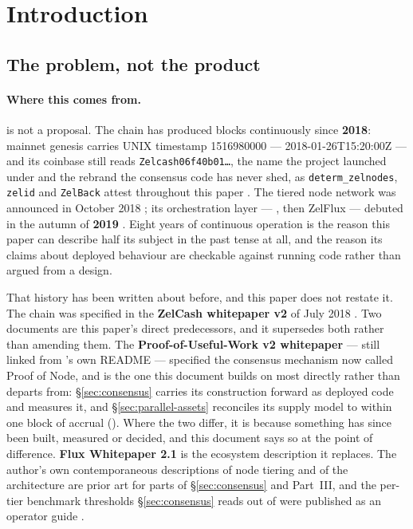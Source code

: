 \section{Introduction}
\label{sec:introduction}

\subsection{The problem, not the product}
\label{sec:intro-problem}

\paragraph{Where this comes from.} \Flux{} is not a proposal. The chain has produced blocks
continuously since \textbf{2018}: mainnet genesis carries UNIX timestamp \num{1516980000} ---
2018-01-26T15:20:00Z --- and its coinbase still reads \texttt{Zelcash06f40b01\ldots}, the name the
project launched under and the rebrand the consensus code has never shed, as \texttt{determ\_zelnodes},
\texttt{zelid} and \texttt{ZelBack} attest throughout this paper \shipped
{}. The tiered node network was
announced in October 2018 \citep{zelnodes2018}; its orchestration layer --- \FluxOS{}, then ZelFlux
--- debuted in the autumn of \textbf{2019} \citep{zelflux2019}. Eight years of continuous operation
is the reason this paper can describe half its subject in the past tense at all, and the reason its
claims about deployed behaviour are checkable against running code rather than argued from a design.

That history has been written about before, and this paper does not restate it. The chain was
specified in the \textbf{ZelCash whitepaper v2} of July 2018 \citep{zelcashwp2018}. Two documents are
this paper's direct predecessors, and it supersedes both rather than amending them. The
\textbf{Proof-of-Useful-Work v2 whitepaper} \citep{fluxpouw2} --- still linked from \fluxd's own
README --- specified the consensus mechanism now called Proof of Node, and is the one this document
builds on most directly rather than departs from: \S\ref{sec:consensus} carries its construction
forward as deployed code and measures it, and \S\ref{sec:parallel-assets} reconciles its supply
model to within one block of accrual (). Where the two differ, it is
because something has since been built, measured or decided, and this document says so at the point
of difference. \textbf{Flux Whitepaper 2.1} \citep{fluxwp21} is the ecosystem description it
replaces. The author's own contemporaneous descriptions of node tiering \citep{kmentazelnode2020} and
of the \FluxOS{} architecture \citep{kmentaflux2020} are prior art for parts of \S\ref{sec:consensus}
and Part~III, and the per-tier benchmark thresholds \S\ref{sec:consensus} reads out of \fluxbench{}
were published as an operator guide \citep{zelbenchguide}.

